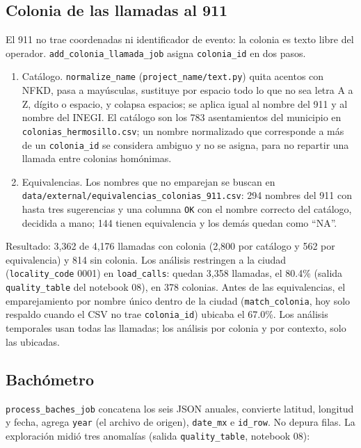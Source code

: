 \documentclass[11pt]{article}
\newcommand{\cod}[1]{\nolinkurl{#1}}
\begin{document}
\subsection{Colonia de las llamadas al 911}
\label{sec:colonia911}

El 911 no trae coordenadas ni identificador de evento: la colonia es texto libre del operador. \cod{add_colonia_llamada_job} asigna \cod{colonia_id} en dos pasos.

\begin{enumerate}
  \item Catálogo. \cod{normalize_name} (\cod{project_name/text.py}) quita acentos con NFKD, pasa a mayúsculas, sustituye por espacio todo lo que no sea letra A a Z, dígito o espacio, y colapsa espacios; se aplica igual al nombre del 911 y al nombre del INEGI. El catálogo son los 783 asentamientos del municipio en \cod{colonias_hermosillo.csv}; un nombre normalizado que corresponde a más de un \cod{colonia_id} se considera ambiguo y no se asigna, para no repartir una llamada entre colonias homónimas.
  \item Equivalencias. Los nombres que no emparejan se buscan en \cod{data/external/equivalencias_colonias_911.csv}: 294 nombres del 911 con hasta tres sugerencias y una columna \cod{OK} con el nombre correcto del catálogo, decidida a mano; 144 tienen equivalencia y los demás quedan como ``NA''.
\end{enumerate}

Resultado: 3,362 de 4,176 llamadas con colonia (2,800 por catálogo y 562 por equivalencia) y 814 sin colonia. Los análisis restringen a la ciudad (\cod{locality_code} 0001) en \cod{load_calls}: quedan 3,358 llamadas, el 80.4\% (salida \cod{quality_table} del notebook 08), en 378 colonias. Antes de las equivalencias, el emparejamiento por nombre único dentro de la ciudad (\cod{match_colonia}, hoy solo respaldo cuando el CSV no trae \cod{colonia_id}) ubicaba el 67.0\%. Los análisis temporales usan todas las llamadas; los análisis por colonia y por contexto, solo las ubicadas.

\subsection{Bachómetro}

\cod{process_baches_job} concatena los seis JSON anuales, convierte latitud, longitud y fecha, agrega \cod{year} (el archivo de origen), \cod{date_mx} e \cod{id_row}. No depura filas. La exploración midió tres anomalías (salida \cod{quality_table}, notebook 08):
\end{document}
